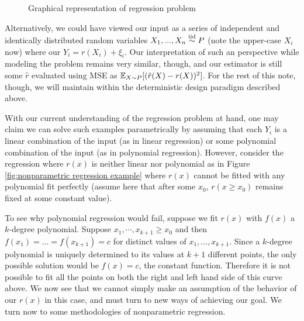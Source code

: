 \begin{figure}[htbp!]
	\begin{center}
		\caption{Graphical representation of regression problem}
		\label{fig:regression example}
	\end{center}
\end{figure}


Alternatively, we could have viewed our input as a series of independent and identically distributed  random variables $X_1, ..., X_n \overset{\textup{iid}}{\sim} P$ (note the upper-case $X_i$ now) where our $Y_i = r(X_i) + \xi_i$. Our interpretation of such an perspective while modeling the problem remains very similar, though, and our estimator is still some $\hat{r}$ evaluated using MSE as $\operatorname*{\mathbb{E}}_{X\sim P} [(\hat{r}(X) - r(X))^2]$. For the rest of this note, though, we will maintain within the deterministic design paradigm described above. 


With our current understanding of the regression problem at hand, one may claim we can solve such examples parametrically by assuming that each $Y_i$ is a linear combination of the input (as in linear regression) or some polynomial combination of the input (as in polynomial regression). However, consider the regression where $r(x)$ is neither linear nor polynomial as in Figure \ref{fig:nonparametric regression example} where $r(x)$ cannot be fitted with any polynomial fit perfectly (assume here that after some $x_0$, $r(x \geq x_0)$ remains fixed at some constant value).

To see why polynomial regression would fail, suppose we fit $r(x)$ with $f(x)$ a $k$-degree polynomial. Suppose $x_1, \cdots, x_{k+1} \geq x_0$ and then $f(x_1) =  ... = f(x_{k+1}) = c$ for distinct values of $x_1, ... , x_{k+1}$. Since a $k$-degree polynomial is uniquely determined to its values at $k+1$ different points, the only possible solution would be $f(x) = c$, the constant function. Therefore it is not possible to fit all the points on both the right and left hand side of this curve above. We now see that we cannot simply make an assumption of the behavior of our $r(x)$ in this case, and must turn to new ways of achieving our goal. We turn now to some methodologies of nonparametric regression. 

